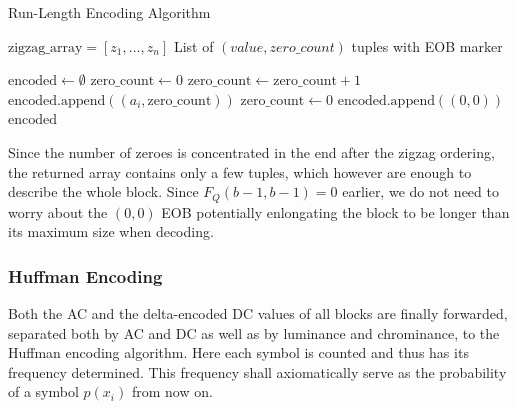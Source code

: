 \begin{algorithm}
	\caption{Run-Length Encoding Algorithm}
	\label{alg:jpeg-rle}
	\begin{algorithmic}[1]
		\Require $\text{zigzag\_array} = [z_1, \ldots, z_n]$
		\Ensure List of $(value, zero\_count)$ tuples with EOB marker
		
		\State $\text{encoded} \gets \emptyset$
		\State $\text{zero\_count} \gets 0$
		\State $\text{zero\_count} \gets \text{zero\_count} + 1$
		\Else
		\State $\text{encoded.append}((a_i, \text{zero\_count}))$
		\State $\text{zero\_count} \gets 0$ 
		\EndIf
		\EndFor
		\State $\text{encoded.append}((0, 0))$ 
		\State \Return $\text{encoded}$
	\end{algorithmic}
\end{algorithm}

Since the number of zeroes is concentrated in the end after the zigzag ordering, the returned array contains only a few tuples, which however are enough to describe the whole block. Since \(F_Q(b-1,b-1) = 0\) earlier, we do not need to worry about the \((0,0)\) EOB potentially enlongating the block to be longer than its maximum size when decoding.


\subsubsection{Huffman Encoding}
Both the AC and the delta-encoded DC values of all blocks are finally forwarded, separated both by AC and DC as well as by luminance and chrominance, to the Huffman encoding algorithm. Here each symbol is counted and thus has its frequency determined. This frequency shall axiomatically serve as the probability of a symbol \(p(x_i)\) from now on.

